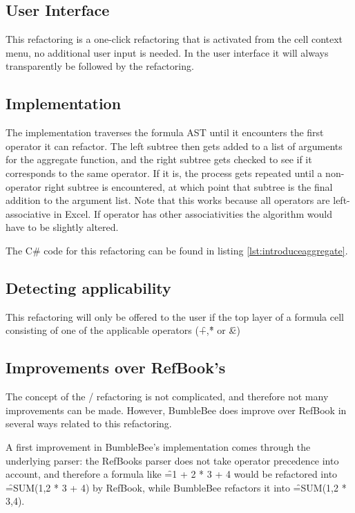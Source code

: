 \subsection{User Interface}

This refactoring is a one-click refactoring that is activated from the cell context menu, no additional user input is needed.
In the user interface it will always transparently be followed by the  refactoring.

\subsection{Implementation}

The implementation traverses the formula AST until it encounters the first operator it can refactor.
The left subtree then gets added to a list of arguments for the aggregate function, and the right subtree gets checked to see if it corresponds to the same operator.
If it is, the process gets repeated until a non-operator right subtree is encountered, at which point that subtree is the final addition to the argument list.
Note that this works because all operators are left-associative in Excel.
If operator has other associativities the algorithm would have to be slightly altered.

The C\# code for this refactoring can be found in listing \ref{lst:introduceaggregate}.

\subsection{Detecting applicability}

This refactoring will only be offered to the user if the top layer of a formula cell consisting of one of the applicable operators (\f{+},\f{*} or \f{\&})

\subsection{Improvements over RefBook's }

The concept of the / refactoring is not complicated, and therefore not many improvements can be made.
However, BumbleBee does improve over RefBook in several ways related to this refactoring.

A first improvement in BumbleBee's implementation comes through the underlying parser: the RefBooks parser does not take operator precedence into account, and therefore a formula like \f{=1 + 2 * 3 + 4} would be refactored into \f{=SUM(1,2 * 3 + 4)} by RefBook, while BumbleBee refactors it into \f{=SUM(1,2 * 3,4)}.

